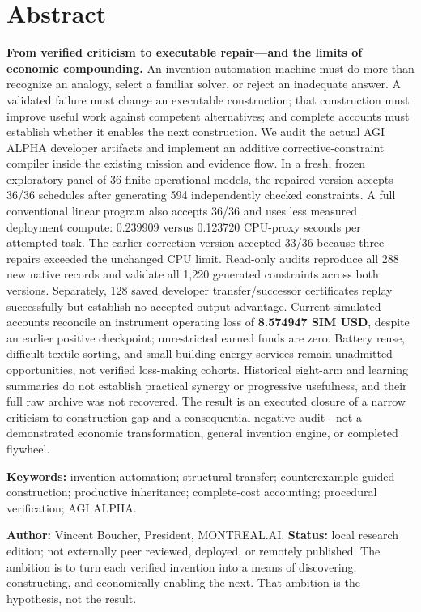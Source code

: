 \section*{Abstract}\label{abstract}

\textbf{From verified criticism to executable repair---and the limits of
economic compounding.} An invention-automation machine must do more than
recognize an analogy, select a familiar solver, or reject an inadequate
answer. A validated failure must change an executable construction; that
construction must improve useful work against competent alternatives;
and complete accounts must establish whether it enables the next
construction. We audit the actual AGI ALPHA developer artifacts and
implement an additive corrective-constraint compiler inside the existing
mission and evidence flow. In a fresh, frozen exploratory panel of 36
finite operational models, the repaired version accepts 36/36 schedules
after generating 594 independently checked constraints. A full
conventional linear program also accepts 36/36 and uses less measured
deployment compute: 0.239909 versus 0.123720 CPU-proxy seconds per
attempted task. The earlier correction version accepted 33/36 because
three repairs exceeded the unchanged CPU limit. Read-only audits
reproduce all 288 new native records and validate all 1,220 generated
constraints across both versions. Separately, 128 saved developer
transfer/successor certificates replay successfully but establish no
accepted-output advantage. Current simulated accounts reconcile an
instrument operating loss of \textbf{8.574947 SIM USD}, despite an
earlier positive checkpoint; unrestricted earned funds are zero. Battery
reuse, difficult textile sorting, and small-building energy services
remain unadmitted opportunities, not verified loss-making cohorts.
Historical eight-arm and learning summaries do not establish practical
synergy or progressive usefulness, and their full raw archive was not
recovered. The result is an executed closure of a narrow
criticism-to-construction gap and a consequential negative audit---not a
demonstrated economic transformation, general invention engine, or
completed flywheel.

\textbf{Keywords:} invention automation; structural transfer;
counterexample-guided construction; productive inheritance;
complete-cost accounting; procedural verification; AGI ALPHA.

\textbf{Author:} Vincent Boucher, President, MONTREAL.AI.
\textbf{Status:} local research edition; not externally peer reviewed,
deployed, or remotely published. The ambition is to turn each verified
invention into a means of discovering, constructing, and economically
enabling the next. That ambition is the hypothesis, not the result.

